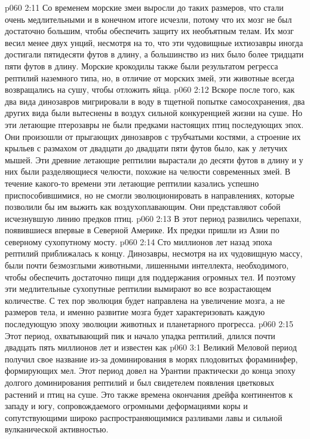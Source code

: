 \vs p060 2:11 Со временем морские змеи выросли до таких размеров, что стали очень медлительными и в конечном итоге исчезли, потому что их мозг не был достаточно большим, чтобы обеспечить защиту их необъятным телам. Их мозг весил менее двух унций, несмотря на то, что эти чудовищные ихтиозавры иногда достигали пятидесяти футов в длину, а большинство из них было более тридцати пяти футов в длину. Морские крокодилы также были результатом регресса рептилий наземного типа, но, в отличие от морских змей, эти животные всегда возвращались на сушу, чтобы отложить яйца.
\vs p060 2:12 Вскоре после того, как два вида динозавров мигрировали в воду в тщетной попытке самосохранения, два других вида были вытеснены в воздух сильной конкуренцией жизни на суше. Но эти летающие птерозавры не были предками настоящих птиц последующих эпох. Они произошли от прыгающих динозавров с трубчатыми костями, а строение их крыльев с размахом от двадцати до двадцати пяти футов было, как у летучих мышей. Эти древние летающие рептилии вырастали до десяти футов в длину и у них были разделяющиеся челюсти, похожие на челюсти современных змей. В течение какого\hyp{}то времени эти летающие рептилии казались успешно приспособившимися, но не смогли эволюционировать в направлениях, которые позволили бы им выжить как воздухоплавающим. Они представляют собой исчезнувшую линию предков птиц.
\vs p060 2:13 В этот период развились черепахи, появившиеся впервые в Северной Америке. Их предки пришли из Азии по северному сухопутному мосту.
\vs p060 2:14 \pc Сто миллионов лет назад эпоха рептилий приближалась к концу. Динозавры, несмотря на их чудовищную массу, были почти безмозглыми животными, лишенными интеллекта, необходимого, чтобы обеспечить достаточно пищи для поддержания огромных тел. И поэтому эти медлительные сухопутные рептилии вымирают во все возрастающем количестве. С тех пор эволюция будет направлена на увеличение мозга, а не размеров тела, и именно развитие мозга будет характеризовать каждую последующую эпоху эволюции животных и планетарного прогресса.
\vs p060 2:15 \pc Этот период, охватывающий пик и начало упадка рептилий, длился почти двадцать пять миллионов лет и известен как 
\vs p060 3:1 Великий Меловой период получил свое название из\hyp{}за доминирования в морях плодовитых фораминифер, формирующих мел. Этот период довел на Урантии практически до конца эпоху долгого доминирования рептилий и был свидетелем появления цветковых растений и птиц на суше. Это также времена окончания дрейфа континентов к западу и югу, сопровождаемого огромными деформациями коры и сопутствующими широко распространяющимися разливами лавы и сильной вулканической активностью.
